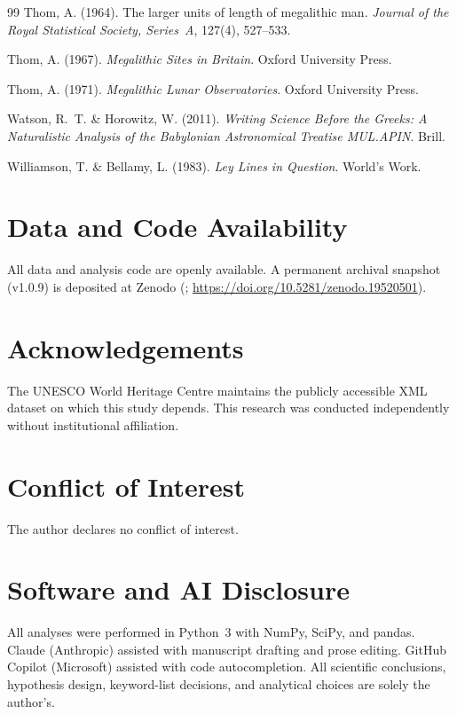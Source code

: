 \documentclass[HARVARD,twocolumn]{USG}
\begin{document}
\begin{thebibliography}{99}
Thom, A. (1964).
The larger units of length of megalithic man.
\textit{Journal of the Royal Statistical Society, Series~A}, 127(4), 527--533.

Thom, A. (1967).
\textit{Megalithic Sites in Britain}.
Oxford University Press.

Thom, A. (1971).
\textit{Megalithic Lunar Observatories}.
Oxford University Press.

Watson, R.~T. \& Horowitz, W. (2011).
\textit{Writing Science Before the Greeks: A Naturalistic Analysis of the
Babylonian Astronomical Treatise MUL.APIN}.
Brill.

Williamson, T. \& Bellamy, L. (1983).
\textit{Ley Lines in Question}.
World's Work.

\end{thebibliography}


\section*{Data and Code Availability}
\label{sec:data_code}
All data and analysis code are openly available. A permanent archival
snapshot (v1.0.9) is deposited at Zenodo
(\citealt{tenenbaum2026audit}; \url{https://doi.org/10.5281/zenodo.19520501}).

\section*{Acknowledgements}
The UNESCO World Heritage Centre maintains the publicly accessible XML
dataset on which this study depends. This research was conducted
independently without institutional affiliation.

\section*{Conflict of Interest}
The author declares no conflict of interest.

\section*{Software and AI Disclosure}
All analyses were performed in Python~3 with NumPy, SciPy, and pandas.
Claude (Anthropic) assisted with manuscript drafting and prose editing.
GitHub Copilot (Microsoft) assisted with code autocompletion.
All scientific conclusions, hypothesis design, keyword-list decisions,
and analytical choices are solely the author's.
\end{document}
